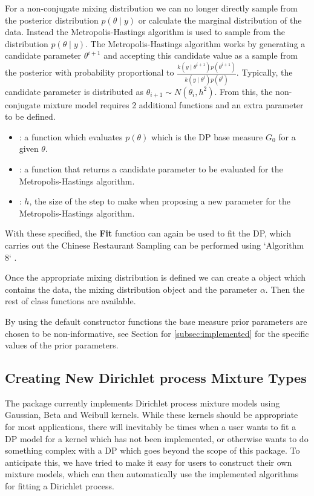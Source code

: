 \documentclass[nojss]{jss}
\begin{document}
For a non-conjugate mixing distribution we can no longer directly sample from the posterior distribution $p(\theta \mid y)$ or calculate the marginal distribution of the data. Instead the Metropolis-Hastings algorithm is used to sample from the distribution $p(\theta \mid y)$. The Metropolis-Hastings algorithm works by generating a candidate parameter $\theta ^{i+1}$ and accepting this candidate value as a sample from the posterior with probability proportional to $\frac{k(y \mid \theta ^{i+1}) p(\theta ^{i+1})}{k(y \mid \theta^i) p(\theta^i)}$. Typically, the candidate parameter is distributed as $\theta _{i+1} \sim N(\theta _i, h^2)$. From this, the non-conjugate mixture model requires 2 additional functions and an extra parameter to be defined.
\begin{itemize}
\item {}: a function which evaluates $p(\theta)$ which is the DP base measure $G_0$ for a given $\theta$.
\item {}: a function that returns a candidate parameter to be evaluated for the Metropolis-Hastings algorithm.
\item {}: $h$, the size of the step to make when proposing a new parameter for the Metropolis-Hastings algorithm.
\end{itemize}

With these specified, the \textbf{Fit} function can again be used to fit the DP, which carries out the Chinese Restaurant Sampling can be performed using `Algorithm 8` \citep{neal_markov_2000}.

Once the appropriate mixing distribution is defined we can create a  object which contains the data, the mixing distribution object and the parameter $\alpha$. Then the rest of  class functions are available.

By using the default constructor functions  the base measure prior parameters are chosen to be non-informative, see Section for \ref{subsec:implemented} for the specific values of the prior parameters.

\subsection{Creating New Dirichlet process Mixture Types} \label{sec:NewMDobj}
The  package currently implements Dirichlet process mixture models using Gaussian, Beta and Weibull kernels. While these kernels should be appropriate for most applications, there will inevitably be times when a user wants to fit a DP model for a kernel which has not been implemented, or otherwise wants to do something complex with a DP which goes beyond the scope of this package. To anticipate this, we have tried to make it easy for users to construct their own mixture models, which can then automatically use the implemented algorithms for fitting a Dirichlet process.
\end{document}
